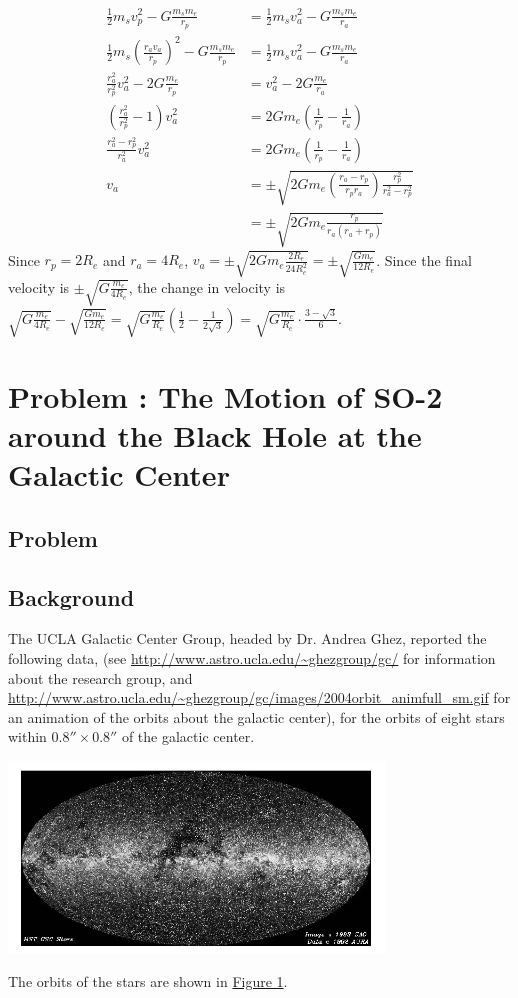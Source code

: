 \documentclass[solutions]{esg8012pset}
\begin{document}
\begin{solution}
\begin{enumerate}[(a)]
\begin{align*}
 \frac{1}{2} m_s v_p^2 - G\frac{m_s m_e}{r_p} & = \frac{1}{2} m_s v_a^2 - G\frac{m_s m_e}{r_a} \\
 \frac{1}{2} m_s \left(\frac{r_a v_a}{r_p}\right)^2 - G\frac{m_s m_e}{r_p} & = \frac{1}{2} m_s v_a^2 - G\frac{m_s m_e}{r_a} \\
 \frac{r_a^2}{r_p^2} v_a^2 - 2G\frac{m_e}{r_p} & = v_a^2 - 2G\frac{m_e}{r_a} \\
 \left(\frac{r_a^2}{r_p^2} - 1\right) v_a^2 & = 2Gm_e\left(\frac{1}{r_p} - \frac{1}{r_a}\right) \\
 \frac{r_a^2 - r_p^2}{r_a^2} v_a^2  & = 2Gm_e\left(\frac{1}{r_p} - \frac{1}{r_a}\right) \\
 v_a  & = \pm\sqrt{2Gm_e\left(\frac{r_a - r_p}{r_p r_a}\right)\frac{r_p^2}{r_a^2 - r_p^2}} \\
   & = \pm\sqrt{2Gm_e\frac{r_p}{r_a(r_a + r_p)}}
\end{align*}  Since $r_p = 2R_e$ and $r_a = 4R_e$, $v_a = \pm\sqrt{2Gm_e\frac{2R_e}{24R_e^2}} = \pm\sqrt{\frac{G m_e}{12R_e}}$.  Since the final velocity is $\pm \sqrt{G\frac{m_e}{4R_e}}$, the change in velocity is $\sqrt{G\frac{m_e}{4R_e}} - \sqrt{\frac{G m_e}{12R_e}} = \sqrt{G\frac{m_e}{R_e}}\left(\frac{1}{2} - \frac{1}{2\sqrt{3}}\right) = \sqrt{G\frac{m_e}{R_e}}\cdot \frac{3 - \sqrt{3}}{6}$.
\end{enumerate}
\section{Problem \thesection: The Motion of SO-2 around the Black Hole at the Galactic Center}
\subsection{Problem}
  \subsection{Background}
    The UCLA Galactic Center Group, headed by Dr. Andrea Ghez, reported the following data, (see \url{http://www.astro.ucla.edu/\~ghezgroup/gc/} for information about the research group, and \url{http://www.astro.ucla.edu/\~ghezgroup/gc/images/2004orbit_animfull_sm.gif} for an animation of the orbits about the galactic center), for the orbits of eight stars within $0.8'' \times 0.8''$ of the galactic center.
    \begin{center}\includegraphics[width=0.75\textwidth]{ps10_3}\end{center}
    The orbits of the stars are shown in \hyperref[fig:orbits]{Figure 1}.


\end{solution}
\end{document}
